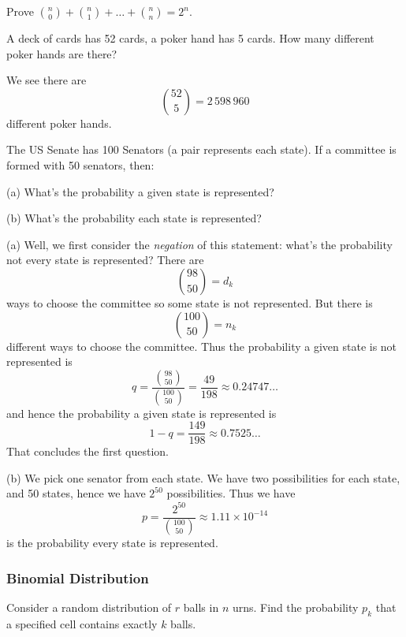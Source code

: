 \begin{xca}
Prove $\binom{n}{0}+\binom{n}{1}+\dots+\binom{n}{n}=2^{n}$.
\end{xca}

A deck of cards has 52 cards, a poker hand has 5 cards.
How many different poker hands are there?

We see there are
\begin{equation}
\binom{52}{5}=2\,598\,960
\end{equation}
different poker hands.

The US Senate has 100 Senators (a pair represents each state). If a
committee is formed with 50 senators, then:

(a) What's the probability a given state is represented?

(b) What's the probability each state is represented?

(a) Well, we first consider the \emph{negation} of this statement: what's
the probability not every state is represented? There are
\begin{equation}
\binom{98}{50} = d_{k}
\end{equation}
ways to choose the committee so some state is not represented. But there
is 
\begin{equation}
\binom{100}{50}=n_{k}
\end{equation}
different ways to choose the committee. Thus the probability a given state is
not represented is
\begin{equation}
q = \frac{\displaystyle\binom{98}{50}}{\displaystyle\binom{100}{50}} = \frac{49}{198}\approx 0.24747\dots
\end{equation}
and hence the probability a given state is represented is
\begin{equation}
1-q = \frac{149}{198} \approx 0.7525\dots
\end{equation}
That concludes the first question.

(b)
We pick one senator from each state. We have two possibilities for each
state, and 50 states, hence we have $2^{50}$ possibilities. Thus we have
\begin{equation}
p = \frac{2^{50}}{\displaystyle\binom{100}{50}} \approx 1.11\times10^{-14}
\end{equation}
is the probability every state is represented.

\subsubsection{Binomial Distribution}
Consider a random distribution of $r$ balls in $n$ urns. Find the
probability $p_{k}$ that a specified cell contains exactly $k$ balls.

